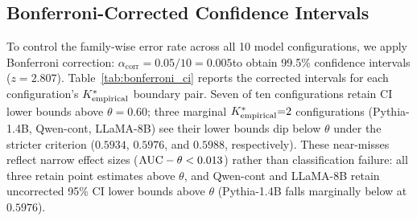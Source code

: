 \begin{table}[h]
\centering
\footnotesize
\caption{Seed robustness: $\Kempirical$ under two random seeds. 1v2 $\Delta$: change in 1v2 AUC from seed 42 to seed 123. $\Kempirical$ is stable in 2/3 configurations; the Qwen-Wiki shift to $\Kempirical{=}3$ is marginal (2v3 fold variance crosses $\theta$).}
\label{tab:seed_robustness}
\end{table}

\subsection{Bonferroni-Corrected Confidence Intervals}
\label{sec:bonferroni_ci}

To control the family-wise error rate across all 10 model configurations, we apply Bonferroni correction: $\alpha_{\text{corr}} = 0.05 / 10 = 0.005$to obtain 99.5\% confidence intervals ($z = 2.807$).
Table~\ref{tab:bonferroni_ci} reports the corrected intervals for each configuration's $\Kempirical$ boundary pair.
Seven of ten configurations retain CI lower bounds above $\theta{=}0.60$; three marginal ${K^*_{\text{empirical}}}{=}2$ configurations (Pythia-1.4B, Qwen-cont, LLaMA-8B) see their lower bounds dip below $\theta$ under the stricter criterion ($0.5934$, $0.5976$, and $0.5988$, respectively).
These near-misses reflect narrow effect sizes ($\text{AUC} - \theta < 0.013$) rather than classification failure: all three retain point estimates above $\theta$, and Qwen-cont and LLaMA-8B retain uncorrected 95\% CI lower bounds above $\theta$ (Pythia-1.4B falls marginally below at $0.5976$).

